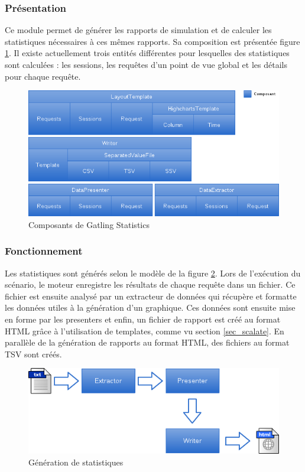 \subsubsection{Présentation}
Ce module permet de générer les rapports de simulation et de calculer les statistiques nécessaires à ces mêmes rapports. Sa composition est présentée figure \ref{gatling_stats}. Il existe actuellement trois entités différentes pour lesquelles des statistiques sont calculées : les sessions, les requêtes d'un point de vue global et les détails pour chaque requête.

\begin{figure}[h]
\begin{center}
\includegraphics[width=400pt]{img/gatling_stats.png}
\end{center}
\caption{Composants de Gatling Statistics}
\label{gatling_stats}
\end{figure}

\subsubsection{Fonctionnement}
Les statistiques sont générés selon le modèle de la figure \ref{stats_gen}. Lors de l'exécution du scénario, le moteur enregistre les résultats de chaque requête dans un fichier. Ce fichier est ensuite analysé par un extracteur de données qui récupère et formatte les données utiles à la génération d'un graphique. Ces données sont ensuite mise en forme par les presenters et enfin, un fichier de rapport est créé au format HTML grâce à l'utilisation de templates, comme vu section \ref{sec_scalate}. En parallèle de la génération de rapports au format HTML, des fichiers au format TSV sont créés.

\begin{figure}[h]
\begin{center}
\includegraphics{img/stats_gen.png}
\end{center}
\caption{Génération de statistiques}
\label{stats_gen}
\end{figure}

